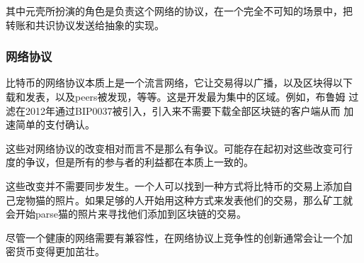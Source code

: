 \documentclass[letterpaper]{article}
\begin{document}
其中元壳所扮演的角色是负责这个网络的协议，在一个完全不可知的场景中，把
转账和共识协议发送给抽象的实现。

\subsubsection{网络协议}

比特币的网络协议本质上是一个流言网络，它让交易得以广播，以及区块得以下
载和发表，以及peers被发现，等等。这是开发最为集中的区域。例如，布鲁姆
过滤在2012年通过BIP0037被引入，引入来不需要下载全部区块链的客户端从而
加速简单的支付确认。

这些对网络协议的改变相对而言不是那么有争议。可能存在起初对这些改变可行
度的争议，但是所有的参与者的利益都在本质上一致的。

这些改变并不需要同步发生。一个人可以找到一种方式将比特币的交易上添加自
己宠物猫的照片。如果足够的人开始用这种方式来发表他们的交易，那么矿工就
会开始parse猫的照片来寻找他们添加到区块链的交易。

尽管一个健康的网络需要有兼容性，在网络协议上竞争性的创新通常会让一个加
密货币变得更加茁壮。
\end{document}
